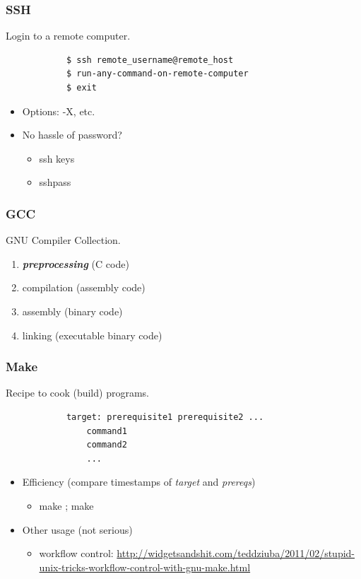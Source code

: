 \documentclass{beamer}
\begin{document}
	\begin{frame}[fragile]
		\frametitle{SSH}
		Login to a remote computer.
		\begin{center}
		\begin{verbatim}
			$ ssh remote_username@remote_host
			$ run-any-command-on-remote-computer
			$ exit
    \end{verbatim}
		\end{center}
		\begin{itemize}
      \item Options: -X, etc.
			\item No hassle of password? \\
			\begin{itemize}
				\item ssh keys
				\item sshpass
			\end{itemize}	
		\end{itemize}
	\end{frame}

  \begin{frame}
    \frametitle{GCC}
    GNU Compiler Collection.

		\begin{enumerate}
      \item \textbf{\textit{preprocessing}} (C code) 
      \item compilation (assembly code)
			\item assembly (binary code)
			\item linking (executable binary code)
    \end{enumerate}
  \end{frame}

  \begin{frame}[fragile]
    \frametitle{Make}
    Recipe to cook (build) programs. 
    \begin{verbatim}
			target: prerequisite1 prerequisite2 ...
			    command1
			    command2
			    ...
    \end{verbatim}
		\begin{itemize}
      \item Efficiency (compare timestamps of \textit{target} and \textit{prereqs})
			\begin{itemize}
        \item make ; make
      \end{itemize}
			\item Other usage (not serious)
			\begin{itemize}
        \item workflow control: \textcolor{ExecusharesGrey}{\footnotesize\hspace{1em}\url{http://widgetsandshit.com/teddziuba/2011/02/stupid-unix-tricks-workflow-control-with-gnu-make.html}}
      \end{itemize}						 
    \end{itemize}	
	\end{frame}
\end{document}
